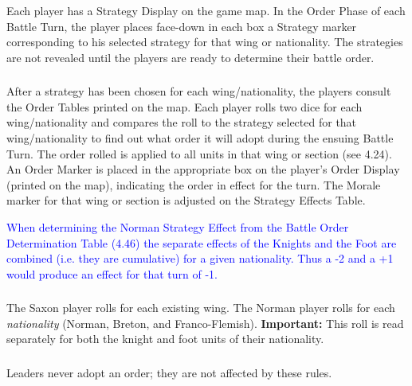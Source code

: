 \subsubsection[Strategy Display]{}

Each player has a Strategy Display on the game map. In the Order Phase of each Battle Turn, the player places face-down in each box a Strategy marker corresponding to his selected strategy for that wing or nationality. The strategies are not revealed until the players are ready to determine their battle order.

\subsubsection[Order Tables]{}

After a strategy has been chosen for each wing/nationality, the players consult the Order Tables printed on the map. Each player rolls two dice for each wing/nationality and compares the roll to the strategy selected for that wing/nationality to find out what order it will adopt during the ensuing Battle Turn. The order rolled is applied to all units in that wing or section (see 4.24). An Order Marker is placed in the appropriate box on the player's Order Display (printed on the map), indicating the order in effect for the turn. The Morale marker for that wing or section is adjusted on the Strategy Effects Table.

\textcolor{blue}{When determining the Norman Strategy Effect from the Battle Order Determination Table (4.46) the separate effects of the Knights and the Foot are combined (i.e. they are cumulative) for a given nationality. Thus a -2 and a +1 would produce an effect for that turn of -1.}

\subsubsection[Orders]{}

The Saxon player rolls for each existing wing. The Norman player rolls for each \textit{nationality} (Norman, Breton, and Franco-Flemish). \textbf{Important:} This roll is read separately for both the knight and foot units of their nationality.

\subsubsection[Leaders and Orders]{}

Leaders never adopt an order; they are not affected by these rules.

